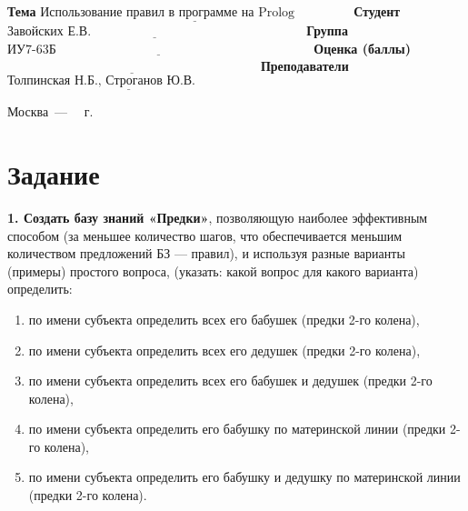 \documentclass[12pt]{report}
\begin{document}
\begin{titlepage}
		\noindent\textbf{Тема} $\underline{\text{Использование правил в программе на Prolog~~~~~~~~~~~~~}}$\newline\newline
		\noindent\textbf{Студент} $\underline{\text{Завойских Е.В.~~~~~~~~~~~~~~~~~~~~~~~~~~~~~~~~~~~~~~~~~~~~~~~~~~}}$\newline\newline
		\noindent\textbf{Группа} $\underline{\text{ИУ7-63Б~~~~~~~~~~~~~~~~~~~~~~~~~~~~~~~~~~~~~~~~~~~~~~~~~~~~~~~~~~~~}}$\newline\newline
		\noindent\textbf{Оценка (баллы)} $\underline{\text{~~~~~~~~~~~~~~~~~~~~~~~~~~~~~~~~~~~~~~~~~~~~~~~~~~~~~~~~~~~}}$\newline\newline
		\noindent\textbf{Преподаватели} $\underline{\text{Толпинская Н.Б., Строганов Ю.В.~~~~~~~~~~~~~}}$\newline\newline\newline
		
		\begin{center}
			\vfill
			Москва~---~\the\year
			~г.
		\end{center}
	\end{titlepage}
		

\section*{Задание}

\textbf{1. Создать базу знаний «Предки»}, позволяющую наиболее эффективным способом (за меньшее количество шагов, что обеспечивается меньшим количеством предложений БЗ --- правил), и используя разные варианты (примеры) простого вопроса, (указать: какой вопрос для какого варианта) определить:

\begin{enumerate}
    \item по имени субъекта определить всех его бабушек (предки 2-го колена),
    \item по имени субъекта определить всех его дедушек (предки 2-го колена),
    \item по имени субъекта определить всех его бабушек и дедушек (предки 2-го колена),
    \item по имени субъекта определить его бабушку по материнской линии (предки 2-го колена),
    \item по имени субъекта определить его бабушку и дедушку по материнской линии
(предки 2-го колена).
\end{enumerate}
\end{document}
